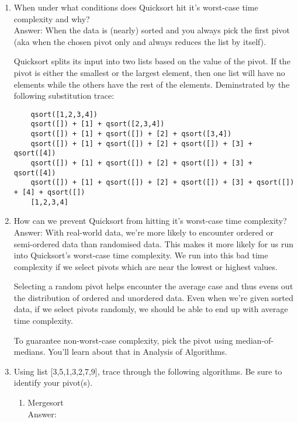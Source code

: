 \documentclass[11pt]{article}
\newenvironment{answer}{\large\lstset{basicstyle=\large}\color{white} \small{Answer:}\large}{}
\newenvironment{answer}{\large\lstset{basicstyle=\large}\color{red} \small{Answer:}\large}{}
\begin{document}
\begin{enumerate}
\item When under what conditions does Quicksort hit it's worst-case time complexity and why? \\
\begin{answer}
When the data is (nearly) sorted and you always pick the first pivot (aka when the chosen pivot only and always reduces the list by itself).

Quicksort splits its input into two lists based on the value of the pivot.  If the pivot is either the smallest or the largest element, then one list will have no elements while the others have the rest of the elements. Deminstrated by the following substitution trace:
	\begin{verbatim}
	qsort([1,2,3,4])
	qsort([]) + [1] + qsort([2,3,4])
	qsort([]) + [1] + qsort([]) + [2] + qsort([3,4])
	qsort([]) + [1] + qsort([]) + [2] + qsort([]) + [3] + qsort([4])
	qsort([]) + [1] + qsort([]) + [2] + qsort([]) + [3] + qsort([4])
	qsort([]) + [1] + qsort([]) + [2] + qsort([]) + [3] + qsort([]) + [4] + qsort([])
	[1,2,3,4]
	\end{verbatim}
\end{answer}


\item How can we prevent Quicksort from hitting it's worst-case time complexity? \\
\begin{answer}
With real-world data, we're more likely to encounter ordered or semi-ordered data than randomised data. This makes it more likely for us run into Quicksort's worst-case time complexity. We run into this bad time complexity if we select pivots which are near the lowest or highest values.

Selecting a random pivot helps encounter the average case and thus evens out the distribution of ordered and unordered data. Even when we're given sorted data, if we select pivots randomly, we should be able to end up with average time complexity.

To guarantee non-worst-case complexity, pick the pivot using median-of-medians.  You'll learn about that in Analysis of Algorithms.
\end{answer}


\pagebreak


\item Using list [3,5,1,3,2,7,9], trace through the following algorithms.  Be sure to identify your pivot(s). \\
\begin{enumerate}
	\item Mergesort \\
	\begin{answer}


\end{answer}
\end{enumerate}
\end{enumerate}
\end{document}
